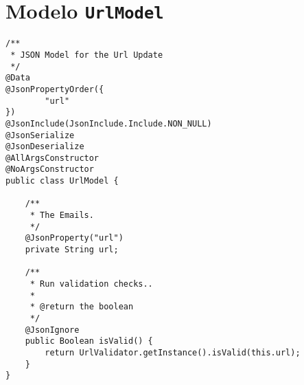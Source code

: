 \chapter{Modelo \texttt{UrlModel}}\label{an5}

\begin{lstlisting}[frame=bt,numbers=none]
/**
 * JSON Model for the Url Update
 */
@Data
@JsonPropertyOrder({
		"url"
})
@JsonInclude(JsonInclude.Include.NON_NULL)
@JsonSerialize
@JsonDeserialize
@AllArgsConstructor
@NoArgsConstructor
public class UrlModel {

	/**
	 * The Emails.
	 */
	@JsonProperty("url")
	private String url;

	/**
	 * Run validation checks..
	 *
	 * @return the boolean
	 */
	@JsonIgnore
	public Boolean isValid() {
		return UrlValidator.getInstance().isValid(this.url);
	}
}
\end{lstlisting}